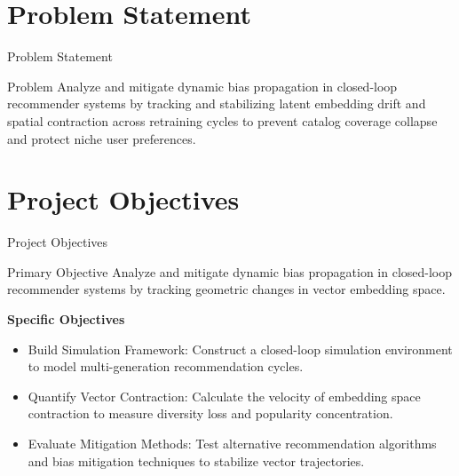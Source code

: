 \documentclass[11pt,aspectratio=43,xcolor=table]{beamer}
\begin{document}
\section{Problem Statement}

\begin{frame}{Problem Statement}

\vfill

\begin{block}{Problem}
\centering
Analyze and mitigate dynamic bias propagation in closed-loop recommender systems by tracking and stabilizing latent embedding drift and spatial contraction across retraining cycles to prevent catalog coverage collapse and protect niche user preferences.
\end{block}

\vfill

\end{frame}

\section{Project Objectives}

\begin{frame}{Project Objectives}

\begin{block}{Primary Objective}
Analyze and mitigate dynamic bias propagation in closed-loop
recommender systems by tracking geometric changes in vector
embedding space.
\end{block}

\vspace{0.2cm}

\textbf{Specific Objectives}
\begin{itemize}
    \item Build Simulation Framework: Construct a closed-loop
simulation environment to model multi-generation
recommendation cycles.
    \item Quantify Vector Contraction: Calculate the velocity of
embedding space contraction to measure diversity loss and
popularity concentration.
    \item Evaluate Mitigation Methods: Test alternative
recommendation algorithms and bias mitigation techniques to
stabilize vector trajectories.
\end{itemize}

\end{frame}
\end{document}
